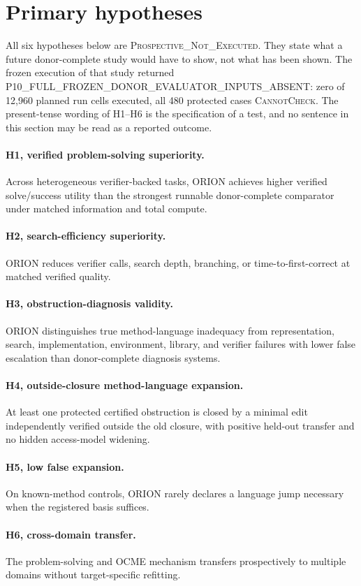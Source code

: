 \section{Primary hypotheses}
All six hypotheses below are \textsc{Prospective\_Not\_Executed}. They state what a future donor-complete study would have to show, not what has been shown. The frozen execution of that study returned \textsc{P10\_FULL\_FROZEN\_DONOR\_EVALUATOR\_INPUTS\_ABSENT}: zero of 12,960 planned run cells executed, all 480 protected cases \textsc{CannotCheck}. The present-tense wording of H1--H6 is the specification of a test, and no sentence in this section may be read as a reported outcome.
\paragraph{H1, verified problem-solving superiority.}
Across heterogeneous verifier-backed tasks, ORION achieves higher verified solve/success utility than the strongest runnable donor-complete comparator under matched information and total compute.

\paragraph{H2, search-efficiency superiority.}
ORION reduces verifier calls, search depth, branching, or time-to-first-correct at matched verified quality.

\paragraph{H3, obstruction-diagnosis validity.}
ORION distinguishes true method-language inadequacy from representation, search, implementation, environment, library, and verifier failures with lower false escalation than donor-complete diagnosis systems.

\paragraph{H4, outside-closure method-language expansion.}
At least one protected certified obstruction is closed by a minimal edit independently verified outside the old closure, with positive held-out transfer and no hidden access-model widening.

\paragraph{H5, low false expansion.}
On known-method controls, ORION rarely declares a language jump necessary when the registered basis suffices.

\paragraph{H6, cross-domain transfer.}
The problem-solving and OCME mechanism transfers prospectively to multiple domains without target-specific refitting.

